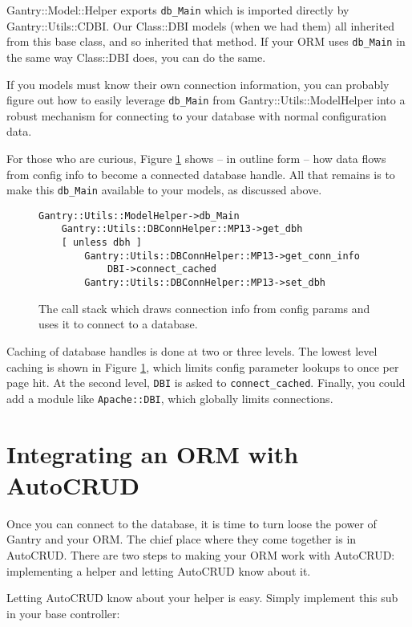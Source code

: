 Gantry::Model::Helper exports \verb+db_Main+ which is imported directly by
Gantry::Utils::CDBI.  Our Class::DBI models (when we had them) all inherited
from this base class, and so inherited that method.  If your ORM uses
\verb+db_Main+ in the same way Class::DBI does, you can do the same.

If you models must know their own connection information, you can probably
figure out how to easily leverage \verb+db_Main+ from
Gantry::Utils::ModelHelper into a robust
mechanism for connecting to your database with normal configuration data.

For those who are curious, Figure \ref{fig:dbconnseq} shows -- in outline
form -- how data flows from config info to become a connected database
handle.  All that remains is to make this \verb+db_Main+ available to
your models, as discussed above.

\begin{figure}
\begin{verbatim}
Gantry::Utils::ModelHelper->db_Main
    Gantry::Utils::DBConnHelper::MP13->get_dbh
    [ unless dbh ]
        Gantry::Utils::DBConnHelper::MP13->get_conn_info
            DBI->connect_cached
        Gantry::Utils::DBConnHelper::MP13->set_dbh
\end{verbatim}
\caption{The call stack which draws connection info from config params and
uses it to connect to a database.}
\label{fig:dbconnseq}
\end{figure}

Caching of database handles is done at two or three levels.  The lowest
level caching is shown in Figure \ref{fig:dbconnseq}, which limits config
parameter lookups to once per page hit.  At the second level, \verb+DBI+
is asked to \verb+connect_cached+.  Finally, you could add a module like
\verb+Apache::DBI+, which globally limits connections.

\section{Integrating an ORM with AutoCRUD}

Once you can connect to the database, it is time to turn loose the power
of Gantry and your ORM.  The chief place where they come together is
in AutoCRUD.  There are two steps to making your ORM work with AutoCRUD:
implementing a helper and letting AutoCRUD know about it.

Letting AutoCRUD know about your helper is easy.  Simply implement this
sub in your base controller:

